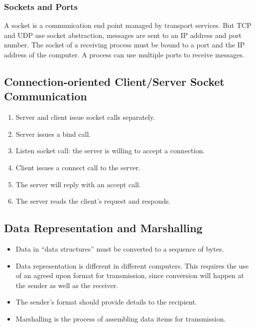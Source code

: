 \documentclass{math}
\begin{document}
\subsubsection*{Sockets and Ports}
A socket is a communication end point managed by transport services. But TCP
and UDP use socket abstraction, messages are sent to an IP address and port
number. The socket of a receiving process must be bound to a port and the IP
address of the computer. A process can use multiple ports to receive messages.

\subsection*{Connection-oriented Client/Server Socket Communication}
\begin{enumerate}
  \item Server and client issue socket calls separately.
  \item Server issues a bind call.
  \item Listen socket call: the server is willing to accept a connection.
  \item Client issues a connect call to the server.
  \item The server will reply with an accept call.
  \item The server reads the client's request and responds.
\end{enumerate}

\subsection*{Data Representation and Marshalling}
\begin{itemize}
  \item Data in ``data structures'' must be converted to a sequence of bytes.
  \item Data representation is different in different computers. This requires
  the use of an agreed upon format for transmission, since conversion will
  happen at the sender as well as the receiver.
  \item The sender's format should provide details to the recipient.
  \item Marshalling is the process of assembling data items for transmission.
\end{itemize}
\end{document}
